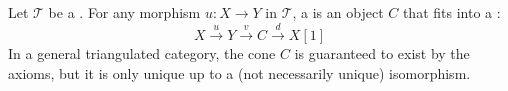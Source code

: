 \begin{definition} \label{definition:cone_of_a_morphism_in_a_triangulated_category}
Let $\mathcal{T}$ be a . For any morphism $u: X \to Y$ in $\mathcal{T}$, a  is an object $C$ that fits into a :
$$X \xrightarrow{u} Y \xrightarrow{v} C \xrightarrow{d} X[1]$$
In a general triangulated category, the cone $C$ is guaranteed to exist by the axioms, but it is only unique up to a (not necessarily unique) isomorphism.
\end{definition}